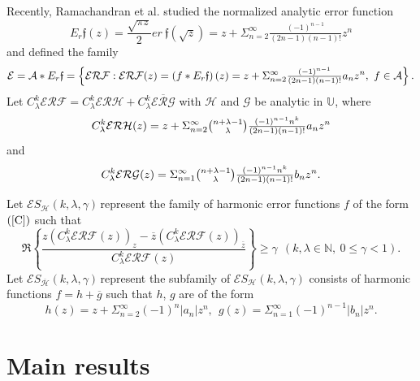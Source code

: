 \documentclass[12pt,reqno]{amsart}
\begin{document}
Recently, Ramachandran et al. \cite{ram} studied the normalized analytic
error function 
\begin{equation*}
E_{r}\mathfrak{f}(z)=\frac{\sqrt{\pi z}}{2}er\ \mathfrak{f}(\sqrt{z})=z+\Sigma_{n=2}^{\infty}\tfrac{(-1)^{n-1}}{(2n-1)(n-1)!}z^{n}
\end{equation*}%
and defined the family
\begin{equation*}
\mathcal{E}=\mathcal{A}\ast E_{r}\mathfrak{f}=\left\{ \mathcal{ERF}:\mathcal{%
ERF}(z)=\left( f\ast E_{r}\mathfrak{f}\right) (z)=z+\Sigma_{n=2}^{\infty}\tfrac{(-1)^{n-1}}{(2n-1)(n-1)!}a_{n}z^{n},\ f\in 
\mathcal{A}\right\} .
\end{equation*}%
Let $C_{\lambda }^{k}\mathcal{ERF}=C_{\lambda }^{k}\mathcal{ERH}+C_{\lambda
}^{k}\overline{\mathcal{ERG}}$ with $\mathcal{H}$ and $\mathcal{G}$ be
analytic in $\mathbb{U}$, where%
\begin{equation*}
C_{\lambda }^{k}\mathcal{ERH}(z)=z+\Sigma_{n=2}^{\infty}\tbinom{n+\lambda -1}{\lambda }\tfrac{(-1)^{n-1}n^{k}}{(2n-1)(n-1)!}a_{n}z^{n}
\end{equation*}%
and%
\begin{equation*}
C_{\lambda }^{k}\mathcal{ERG}(z)=\Sigma_{n=1}^{\infty}\tbinom{n+\lambda
-1}{\lambda }\tfrac{(-1)^{n-1}n^{k}}{(2n-1)(n-1)!}b_{n}z^{n}.
\end{equation*}

Let $\mathcal{E}S_{\mathcal{H}}(k,\lambda ,\gamma )\,$represent the family
of harmonic error functions $f$ of the form $(\ref{C})$ such that 
\begin{equation}
\Re \left\{ \frac{z\left( C_{\lambda }^{k}\mathcal{ERF}(z)\right) _{z}-
\overline{z}\left( C_{\lambda }^{k}\mathcal{ERF}(z)\right) _{\overline{z}}}{C_{\lambda }^{k}\mathcal{ERF}(z)}\right\} \geq \gamma ~\ \left( k,\lambda
\in \mathbb{N},\ 0\leq \gamma <1\right) .  \label{5}
\end{equation}%
Let $\mathcal{E}S_{\overline{\mathcal{H}}}(k,\lambda ,\gamma )\,$represent
the subfamily of $\mathcal{E}S_{\mathcal{H}}(k,\lambda ,\gamma )$ consists of
harmonic functions $f=h+\overline{g}$ such that $h$, $g$ are of the form 
\begin{equation}
h(z)=z+\Sigma_{n=2}^{\infty}(-1)^{n}\left\vert a_{n}\right\vert
z^{n},~\ g(z)=\Sigma_{n=1}^{\infty}(-1)^{n-1}\left\vert
b_{n}\right\vert z^{n}.  \label{x}
\end{equation}

\section{Main results}
\end{document}
